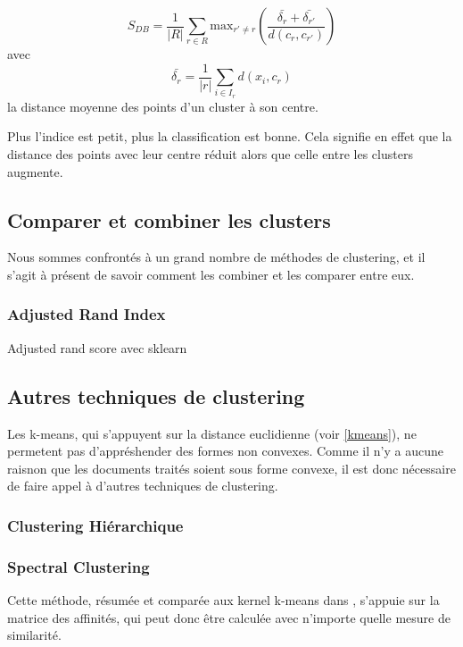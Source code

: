 \[
S_{DB}  = \frac{1}{|R|}\sum_{r\in R}\mathrm{max}_{r'\neq r}\left(\frac{\bar{\delta_r}+\bar{\delta_{r'}}}{d(c_r,c_{r'})}\right)
\]
avec
\[\bar{\delta_r} = \frac{1}{|r|}\sum_{i \in I_r}d(x_i,c_r)\]
la distance moyenne des points d'un cluster à son centre.

Plus l'indice est petit, plus la classification est bonne. Cela signifie en effet que la distance des points avec leur centre réduit alors que celle entre les clusters augmente.

\subsection{Comparer et combiner les clusters}
Nous sommes confrontés à un grand nombre de méthodes de clustering, et il s'agit à présent de savoir comment les combiner et les comparer entre eux.

\subsubsection{Adjusted Rand Index}
Adjusted rand score avec sklearn 

\subsection{Autres techniques de clustering}
Les k-means, qui s'appuyent sur la distance euclidienne (voir \ref{kmeans}), ne permetent pas d'appréshender des formes non convexes. Comme il n'y a aucune raisnon que les documents traités soient sous forme convexe, il est donc nécessaire de faire appel à d'autres techniques de clustering.

\subsubsection{Clustering Hiérarchique}

\subsubsection{Spectral Clustering}
Cette méthode, résumée et comparée aux kernel k-means dans \cite{kernelSpectral2004}, s'appuie sur la matrice des affinités, qui peut donc être calculée avec n'importe quelle mesure de similarité. 